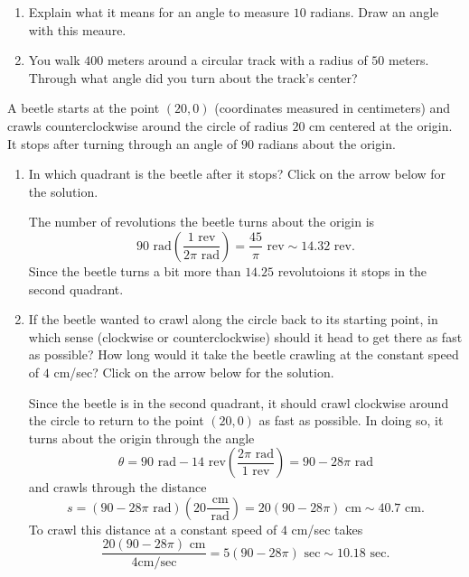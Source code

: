 \documentclass{ximera}
\begin{document}
\begin{question}  \label{Q2873:Angles}
\begin{enumerate}
\item Explain what it means for an angle to measure $10$ radians. Draw an angle with this meaure.

\item You walk $400$ meters around a circular track with a radius of $50$ meters. Through what angle did you turn about the track's center?

\end{enumerate}

\end{question}

\begin{question} \label{Q9dfdEREFDF}
A beetle starts at the point $(20,0)$ (coordinates measured in centimeters) and crawls counterclockwise around the circle of radius $20$ cm centered at the origin. It stops after turning through an angle of $90$ radians about the origin.

\begin{enumerate}
\item In which quadrant is the beetle after it stops? Click on the arrow below for the solution.

\begin{expandable}
The number of revolutions the beetle turns about the origin is
\[
    90 \text{ rad} \left( \frac{1\text{ rev}}{2\pi \text{ rad}} \right) = \frac{45}{\pi} \text{ rev} \sim 14.32 \text{ rev}.
\]
Since the beetle turns a bit more than $14.25$ revolutoions it stops in the second quadrant.
\end{expandable}

\item If the beetle wanted to crawl along the circle back to its starting point, in which sense (clockwise or counterclockwise) should it head to get there as fast as possible? How long would it take the beetle crawling at the constant speed of $4$ cm/sec?  Click on the arrow below for the solution.

\begin{expandable}
Since the beetle is in the second quadrant, it should crawl clockwise around the circle to return to the point $(20,0)$ as fast as possible. In doing so, it turns about the origin through the angle
\[
     \theta = 90\text{ rad} - 14\text{ rev} \left( \frac{2\pi \text{ rad}}{1 \text{ rev}} \right) = 90 - 28\pi \text{ rad} 
\]
and crawls through the distance
\[
 s =  (  90 - 28\pi \text{ rad}  ) \left( 20 \frac{\text{ cm}}{\text{ rad}} \right) = 20 (90 - 28\pi)\text{ cm} \sim 40.7\text{ cm}.
\]
To crawl this distance at a constant speed of $4$ cm/sec takes
\[
         \frac{20 (90 - 28\pi)\text{ cm}}{4\text{cm/sec}} = 5(90-28\pi)\text{ sec} \sim 10.18 \text{ sec}.
\]
\end{expandable}

\end{enumerate}

\end{question}
\end{document}
